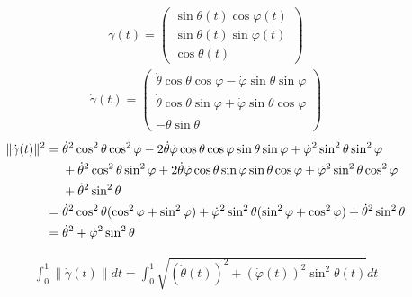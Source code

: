 \documentclass{ltjsbook}
\begin{document}
\begin{align*}
    \gamma(t) =
    \begin{pmatrix}
        \sin \theta(t) \cos \varphi(t) \\
        \sin \theta(t) \sin \varphi(t) \\
        \cos \theta(t)
    \end{pmatrix}
\end{align*}
\begin{align*}
    \dot{\gamma}(t) =
    \begin{pmatrix}
        \dot{\theta} \cos \theta \cos \varphi - \dot{\varphi}\sin \theta \sin \varphi \\
        \dot{\theta} \cos \theta \sin \varphi + \dot{\varphi}\sin \theta \cos \varphi \\
        - \dot{\theta} \sin \theta
    \end{pmatrix}
\end{align*}
\begin{align*}
    \lVert \dot{\gamma}(t) \rVert^2
        &= \dot{\theta}^2 \cos^2 \theta \cos^2 \varphi
        - 2 \dot{\theta} \dot{\varphi} \cos \theta \cos \varphi \sin \theta  \sin \varphi
        + \dot{\varphi}^2 \sin^2 \theta \sin^2 \varphi \\
        &\mathrel{\hphantom{=}}{\relax} \mathbin{+} \dot{\theta}^2 \cos^2 \theta \sin^2 \varphi
             + 2 \dot{\theta} \dot{\varphi} \cos \theta \sin \varphi \sin \theta  \cos \varphi
            + \dot{\varphi}^2 \sin^2 \theta \cos^2 \varphi \\
        &\mathrel{\hphantom{=}}{\relax} \mathbin{+} \dot{\theta}^2 \sin^2 \theta \\
        &= \dot{\theta}^2 \cos^2 \theta (\cos^2\varphi + \sin^2 \varphi) + \dot{\varphi}^2 \sin^2 \theta (\sin^2 \varphi + \cos^2 \varphi) + \dot{\theta}^2 \sin^2 \theta \\
        &= \dot{\theta}^2  + \dot{\varphi}^2 \sin^2 \theta \\
\end{align*}

\begin{align*}
    \int_0^1 \lVert \dot{\gamma}(t) \rVert dt
    = \int_0^1 \sqrt{(\dot{\theta}(t))^2  + (\dot{\varphi}(t))^2 \sin^2 \theta(t)} dt
\end{align*}
\end{document}

